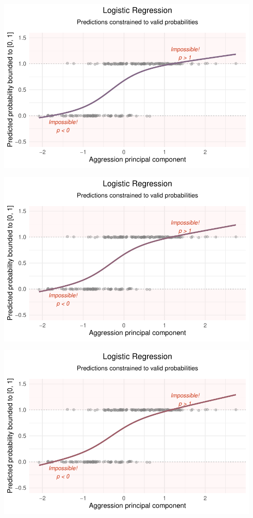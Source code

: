 \documentclass[
  letterpaper,
  DIV=11,
  numbers=noendperiod]{scrartcl}
\begin{document}
\begin{center}
\includegraphics[width=0.8\linewidth,height=\textheight,keepaspectratio]{Beyond!!!_files/figure-pdf/unnamed-chunk-4-84.pdf}
\end{center}

\begin{center}
\includegraphics[width=0.8\linewidth,height=\textheight,keepaspectratio]{Beyond!!!_files/figure-pdf/unnamed-chunk-4-85.pdf}
\end{center}

\begin{center}
\includegraphics[width=0.8\linewidth,height=\textheight,keepaspectratio]{Beyond!!!_files/figure-pdf/unnamed-chunk-4-86.pdf}
\end{center}
\end{document}
